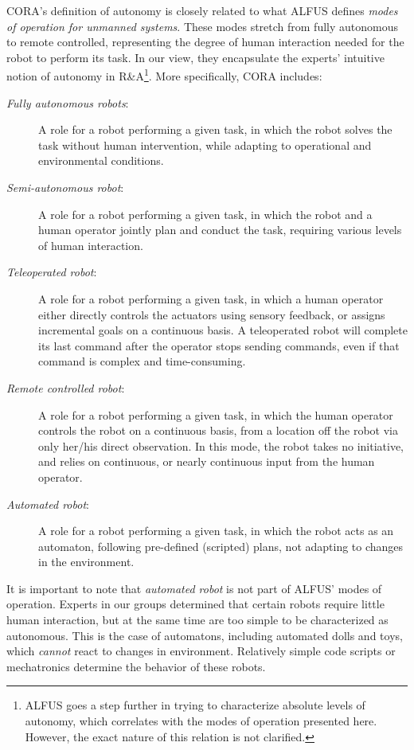 \documentclass[preprint,12pt]{elsarticle}
\begin{document}
CORA's definition of autonomy is closely related to what ALFUS defines \emph{modes of operation for unmanned systems}. These modes stretch from fully autonomous to remote controlled, representing the degree of human interaction needed for the robot to perform its task. In our view, they encapsulate the experts' intuitive notion of autonomy in R\&A\footnote{ALFUS goes a step further in trying to characterize absolute levels of autonomy, which  correlates with the modes of operation presented here. However, the exact nature of this relation is not clarified.}. More specifically, CORA includes:

\begin{description}
    \item[\emph{Fully autonomous robots}:] A role for a robot performing a given task, in which the robot solves the task without human intervention, while adapting to operational and environmental conditions. 
    \item[\emph{Semi-autonomous robot}:] A role for a robot performing a given task, in which the robot and a human operator jointly plan and conduct the task, requiring various levels of human interaction. 
    
    \item[\emph{Teleoperated robot}:] A role for a robot performing a given task, in which a human operator either directly controls the actuators using sensory feedback, or assigns incremental goals on a continuous basis. A teleoperated robot will complete its last command after the operator stops sending commands, even if that command is complex and time-consuming. 
    
    \item[\emph{Remote controlled robot}:] A role for a robot performing a given task, in which the human operator controls the robot on a continuous basis, from a location off the robot via only her/his direct observation. In this mode, the robot takes no initiative, and relies on continuous, or nearly continuous input from the human operator.
    
    \item[\emph{Automated robot}:] A role for a robot performing a given task, in which the robot acts as an automaton, following pre-defined (scripted) plans, not adapting to changes in the environment.
\end{description}

It is important to note that \emph{automated robot} is not part of ALFUS' modes of operation. Experts in our groups determined that certain robots require little human interaction, but at the same time are too simple to be characterized as autonomous. This is the case of automatons, including automated dolls and toys, which \emph{cannot} react to changes in environment. Relatively simple code scripts or mechatronics determine the behavior of these robots.  
\end{document}
